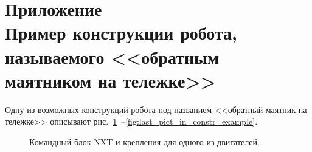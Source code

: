 \documentclass[12pt,a4paper,openany]{extarticle}
\begin{document}
\newpage
\section*{Приложение \myappnum\label{append:inv_pend_constr}\\
Пример конструкции робота, называемого <<обратным маятником на тележке>>}
\hspace*{\parindent}Одну из возможных конструкций робота под названием <<обратный маятник на тележке>> описывают рис.~\ref{fig:first_pict_in_constr_example}~--\ref{fig:last_pict_in_constr_example}.
\vfill
\begin{figure}[h]
	\begin{minipage}[h]{0.49\linewidth}
	\end{minipage}
	\hfill
	\begin{minipage}[h]{0.49\linewidth}
	\end{minipage}
	\caption{Командный блок NXT и крепления для одного из двигателей.}
	\label{fig:first_pict_in_constr_example}
\end{figure}
\vfill
\end{document}
